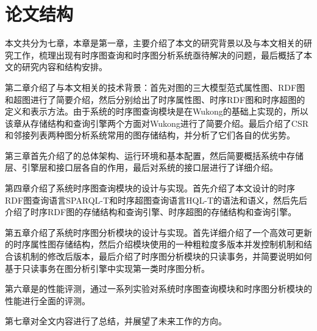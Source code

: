 \section{论文结构}
本文共分为七章，本章是第一章，主要介绍了本文的研究背景以及与本文相关的研究工作，梳理出现有时序图查询和时序图分析系统亟待解决的问题，最后概括了本文的研究内容和结构安排。

第二章介绍了与本文相关的技术背景：首先对图的三大模型范式属性图、RDF图和超图进行了简要介绍，然后分别给出了时序属性图、时序RDF图和时序超图的定义和表示方法。由于系统的时序图查询模块是在Wukong的基础上实现的，所以该章从存储结构和查询引擎两个方面对Wukong进行了简要介绍。最后介绍了CSR和邻接列表两种图分析系统常用的图存储结构，并分析了它们各自的优劣势。

第三章首先介绍了\sys 的总体架构、运行环境和基本配置，然后简要概括系统中存储层、引擎层和接口层各自的作用，最后对系统的接口层进行了详细介绍。

第四章介绍了系统时序图查询模块的设计与实现。首先介绍了本文设计的时序RDF图查询语言SPARQL-T和时序超图查询语言HQL-T的语法和语义，然后先后介绍了时序RDF图的存储结构和查询引擎、时序超图的存储结构和查询引擎。

第五章介绍了系统时序图分析模块的设计与实现。首先详细介绍了一个高效可更新的时序属性图存储结构\store，然后介绍模块使用的一种粗粒度多版本并发控制机制和\store 结合该机制的修改后版本\newstore，最后介绍了时序图分析模块的只读事务，并简要说明如何基于只读事务在图分析引擎中实现第一类时序图分析。

第六章是\sys 的性能评测，通过一系列实验对系统时序图查询模块和时序图分析模块的性能进行全面的评测。

第七章对全文内容进行了总结，并展望了未来工作的方向。

